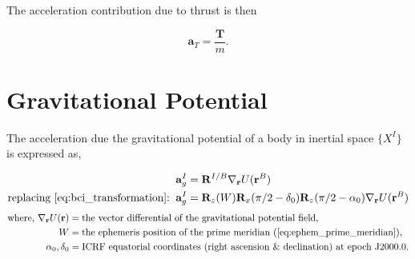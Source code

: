 The acceleration contribution due to thrust is then

\begin{equation}
    \mathbf{a}_T = \frac{\mathbf{T}}{m}.
\end{equation}


\section{Gravitational Potential}

The acceleration due the gravitational potential of a body in inertial space $\{X^I\}$ is expressed as,


\begin{equation}
    \begin{aligned}
        \mathbf{a}_g^I &= \mathbf{R}^{I/B}\nabla_{\mathbf{r}}U(\mathbf{r}^B)\\
        \textrm{replacing \autoref{eq:bci_transformation}:}\;\;\mathbf{a}_g^I &=  \mathbf{R}_z(W)\mathbf{R}_x(\pi/2-\delta_0)\mathbf{R}_z(\pi/2-\alpha_0)\nabla_{\mathbf{r}}U(\mathbf{r}^B)
        \label{eq:accel_grav_pot}
    \end{aligned}
\end{equation}
\begin{equation*}
    \begin{aligned}
        \textrm{where, }
        \nabla_{\mathbf{r}}U(\mathbf{r}) &= \textrm{the vector differential of the gravitational potential field,} \\
        W &= \textrm{the ephemeris position of the prime meridian (\autoref{eq:ephem_prime_meridian}),}\\
        \alpha_0, \delta_0 &= \textrm{ICRF equatorial coordinates (right ascension \& declination) at epoch J2000.0.} \\
    \end{aligned}
\end{equation*}

